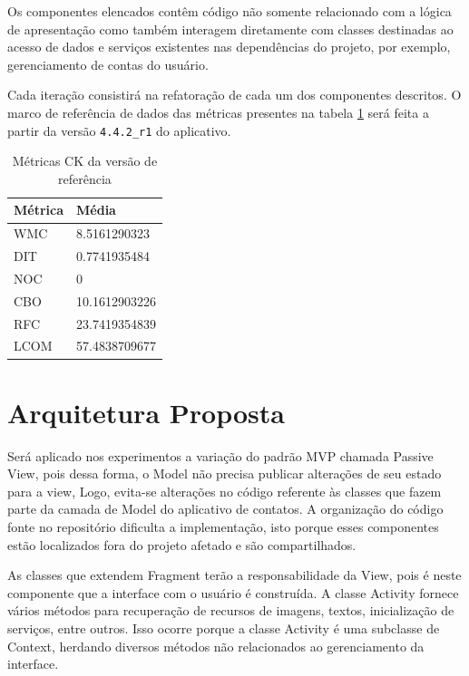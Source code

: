 Os componentes elencados contêm código não somente relacionado com a lógica de
apresentação como também interagem diretamente com classes destinadas ao acesso
de dados e serviços existentes nas dependências do projeto, por exemplo,
gerenciamento de contas do usuário. 

Cada iteração consistirá na refatoração de cada um dos componentes
descritos. O marco de referência de dados das métricas presentes na tabela \ref{tab:dados_baseline} será feita a partir da
versão \verb|4.4.2_r1| do aplicativo.

\begin{table}[h]
	\centering
    \begin{tabular}{ | l | l | }
    \hline
    Métrica &	Média \\ \hline
    WMC  	&	8.5161290323   	\\ \hline
    DIT	 	&	0.7741935484	\\ \hline
	NOC  	& 	0				\\ \hline
	CBO	  	& 	10.1612903226	\\ \hline
	RFC	 	& 	23.7419354839	\\ \hline
	LCOM 	& 	57.4838709677	\\ \hline
    \end{tabular}
    \caption{Métricas CK da versão de referência}
    \label{tab:dados_baseline}
\end{table}

\section{Arquitetura Proposta}


Será aplicado nos experimentos a variação do padrão MVP chamada Passive View,
pois dessa forma, o Model não precisa publicar alterações de seu estado para a
view, Logo, evita-se alterações no código referente às classes que fazem
parte da camada de Model do aplicativo de contatos. A organização do código
fonte no repositório dificulta a implementação, isto porque esses componentes estão
localizados fora do projeto afetado e são compartilhados.

As classes que extendem Fragment terão a responsabilidade da View, pois é neste
componente que a interface com o usuário é construída. A classe Activity fornece
vários métodos para recuperação de recursos de imagens, textos, inicialização de
serviços, entre outros. Isso ocorre porque a classe Activity é uma subclasse de Context, herdando diversos métodos não relacionados ao gerenciamento da interface.

